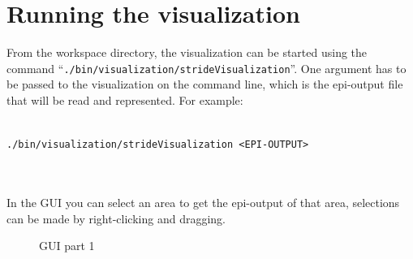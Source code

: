 \section{Running the visualization}	

From the workspace directory, the visualization can be started  using the command \mbox{``\texttt{./bin/visualization/strideVisualization}''}. One argument has to be passed to the visualization on the command line, which is the epi-output file that will be read and represented. For example: \\ \\
\centerline{\texttt{./bin/visualization/strideVisualization \textless EPI-OUTPUT\textgreater}} \\ \\
In the GUI you can select an area to get the epi-output of that area, selections can be made by right-clicking and dragging.

\begin{center}
	\begin{figure}[hbtp!]
		\caption{GUI part 1} \label{gui1}
	\end{figure}
\end{center}


